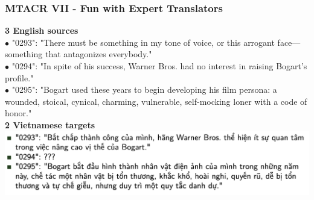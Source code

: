 \documentclass[aspectratio=169]{beamer}
\begin{document}
\begin{frame}[fragile]
	\frametitle{MTACR VII - Fun with Expert Translators}
    \begin{minipage}{.55\textwidth}
        \centering
        \textbf{3 English sources}
        \\ \tiny {\color{thiscolor}$\bullet$} "0293": "There must be something in my tone of voice, or this arrogant face—something that antagonizes everybody."
        \\ \tiny {\color{thiscolor}$\bullet$} "0294": "In spite of his success, Warner Bros. had no interest in raising Bogart's profile."
        \\ \tiny {\color{thiscolor}$\bullet$} "0295": "Bogart used these years to begin developing his film persona: a wounded, stoical, cynical, charming, vulnerable, self-mocking loner with a code of honor."
        \\ \normalsize \textbf{2 Vietnamese targets}
        \\ \includegraphics[width=\textwidth]{images/challenge-vie-1.png}
    \end{minipage}%
    \begin{minipage}{.45\textwidth}

\end{minipage}
\end{frame}
\end{document}
